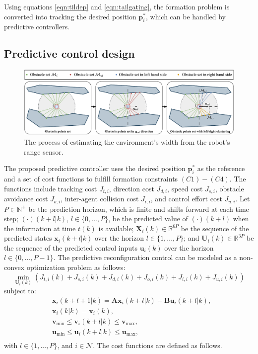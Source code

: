 Using equations \eqref{eqn:tildep} and \eqref{eqn:tailgating}, the formation problem is converted into tracking the desired position $\mathbf{p}_i^*$, which can be handled by predictive controllers. 

\subsection{Predictive control design} 
\begin{figure}
    \centering
    \includegraphics[width=\textwidth]{paper3/images/perception.pdf}
    \caption{The process of estimating the environment's width from the robot's range sensor.}
    \label{fig:perception}
\end{figure}
The proposed predictive controller uses the desired position $\mathbf{p}_i^*$ as the reference and a set of cost functions to fulfill formation constraints $(C1)-(C4)$. The functions include tracking cost $J_{t,i}$, direction cost $J_{d,i}$, speed cost $J_{s,i}$, obstacle avoidance cost $J_{o,i}$, inter-agent collision cost $J_{i,i}$, and control effort cost $J_{u,i}$. Let $P\in\mathbb{N}^+$ be the prediction horizon, which is finite and shifts forward at each time step; $(\cdot)(k+l|k )$, $l \in\{0,...,P\}$, be the predicted value of $(\cdot)(k+l )$ when the information at time $t(k)$ is available; $\mathbf{X}_i(k)\in\mathbb{R}^{6P}$ be the sequence of the predicted states $\mathbf{x}_i(k+l|k)$ over the horizon $l\in\{1,...,P\}$; and $\mathbf{U}_i(k)\in\mathbb{R}^{3P}$ be the sequence of the predicted control inputs $\mathbf{u}_i(k)$ over the horizon $l\in\{0,...,P-1\}$. The predictive reconfiguration control can be modeled as a non-convex optimization problem as follows:
\begin{equation}
    \min_{\mathbf{U}_i(k)}\left(J_{t,i}(k)+J_{s,i}(k)+J_{d,i}(k)+J_{o,i}(k)+J_{i,i}(k)+J_{u,i}(k)\right)
    \label{eqn:J}
\end{equation}
subject to:
\begin{equation}
    \begin{aligned}
        &\mathbf{x}_i(k+l+1|k)=\mathbf{A}\mathbf{x}_i(k+l|k)+\mathbf{B}\mathbf{u}_i(k+l|k),\\
        &\mathbf{x}_i(k|k)=\mathbf{x}_i(k),\\
        &\mathbf{v}_\text{min}\leq \mathbf{v}_i(k+l|k)\leq \mathbf{v}_\text{max},\\
        &\mathbf{u}_\text{min}\leq \mathbf{u}_i(k+l|k)\leq \mathbf{u}_\text{max},\\
    \end{aligned}
    \label{eqn:constraints}
\end{equation}
with $l\in\{1,...,P\}$, and $i\in\mathcal{N}$. The cost functions are defined as follows.

